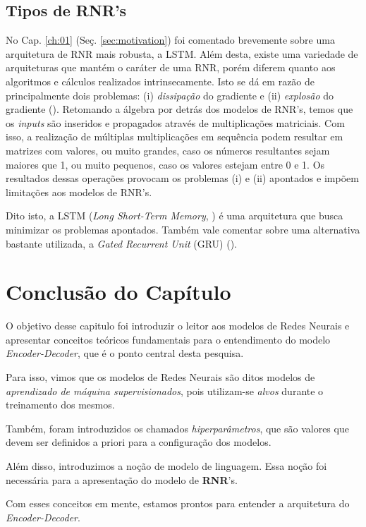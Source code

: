 

\subsection{Tipos de RNR's}

No Cap. \ref{ch:01} (Seç. \ref{sec:motivation}) foi comentado brevemente sobre uma arquitetura de RNR mais robusta, a LSTM. Além desta, existe uma variedade de arquiteturas que mantém o caráter de uma RNR, porém diferem quanto aos algoritmos e cálculos realizados intrinsecamente. Isto se dá em razão de principalmente dois problemas: (i) \textit{dissipação} do gradiente e (ii) \textit{explosão} do gradiente  (\cite{Goodfellow-et-al-2016}). Retomando a álgebra por detrás dos modelos de RNR's, temos que os \textit{inputs} são inseridos e propagados através de multiplicações matriciais. Com isso, a realização de múltiplas multiplicações em sequência podem resultar em matrizes com valores, ou muito grandes, caso os números resultantes sejam maiores que 1, ou muito pequenos, caso os valores estejam entre 0 e 1. Os resultados dessas operações provocam os problemas (i) e (ii) apontados e impõem limitações aos modelos de RNR's. 

Dito isto, a LSTM (\textit{Long Short-Term Memory}, \cite{hochreiter:1997}) é uma arquitetura que busca minimizar os problemas apontados. Também vale comentar sobre uma alternativa bastante utilizada, a \textit{Gated Recurrent Unit} (GRU) (\cite{Goodfellow-et-al-2016}).

\section{Conclusão do Capítulo}

O objetivo desse capitulo foi introduzir o leitor aos modelos de Redes Neurais e apresentar conceitos teóricos fundamentais para o entendimento do modelo \textit{Encoder-Decoder}, que é o ponto central desta pesquisa.

Para isso, vimos que os modelos de Redes Neurais são ditos modelos de \textit{aprendizado de máquina supervisionados}, pois utilizam-se \textit{alvos} durante o treinamento dos mesmos.

Também, foram introduzidos os chamados \textit{hiperparâmetros}, que são valores que devem ser definidos a priori para a configuração dos modelos. 

Além disso, introduzimos a noção de modelo de linguagem. Essa noção foi necessária para a apresentação do modelo de \textbf{RNR}'s. 

Com esses conceitos em mente, estamos prontos para entender a arquitetura do \textit{Encoder-Decoder}.

